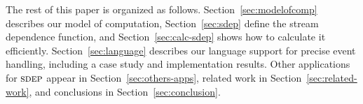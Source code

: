 The rest of this paper is organized as follows.  Section~\ref{sec:modelofcomp} describes
our model of computation, Section~\ref{sec:sdep} 
define the stream dependence function, and Section~\ref{sec:calc-sdep}
shows how to calculate it
efficiently.  Section~\ref{sec:language} describes our language support for precise
event handling, including a case study and implementation results.
Other applications for $\textsc{sdep}$ appear in
Section~\ref{sec:others-apps}, related work in
Section~\ref{sec:related-work}, and conclusions in
Section~\ref{sec:conclusion}.



				   
